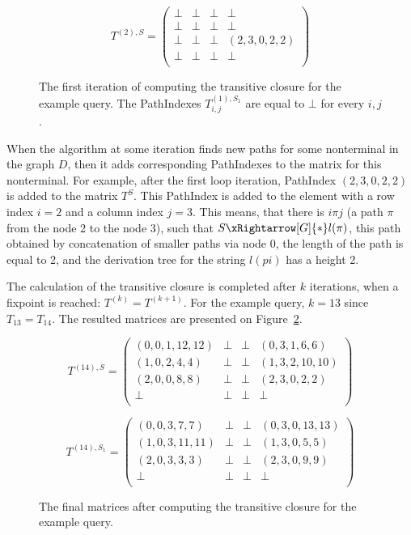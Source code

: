 \begin{figure}[h]
	\[
	T^{(2),S} = \begin{pmatrix}
	\bot & \bot       & \bot & \bot       \\
	\bot & \bot & \bot       & \bot \\
	\bot       & \bot & \bot & (2,3,0,2,2) \\
	\bot       & \bot & \bot & \bot \\
	\end{pmatrix}
	\]
	\caption{The first iteration of computing the transitive closure for the example query. The PathIndexes $T^{(1),S_1}_{i,j}$ are equal to $\bot$ for every $i,j$.}
	\label{ExampleQueryFirstIteration}
\end{figure}

When the algorithm at some iteration finds new paths for some nonterminal in the graph $D$, then it adds corresponding PathIndexes to the matrix for this nonterminal. For example, after the first loop iteration, PathIndex $(2,3,0,2,2)$ is added to the matrix $T^{S}$. This PathIndex is added to the element with a row index $i = 2$ and a column index $j = 3$. This means, that there is $i\pi j$ (a path $\pi$ from the node 2 to the node 3), such that $S \xRightarrow[G]{*} l(\pi)$, this path obtained by concatenation of smaller paths via node 0, the length of the path is equal to 2, and the derivation tree for the string $l(pi)$ has a height 2.

The calculation of the transitive closure is completed after $k$ iterations, when a fixpoint is reached: $T^{(k)} = T^{(k+1)}$. For the example query, $k = 13$ since $T_{13} = T_{14}$. The resulted matrices are presented on Figure~\ref{ExampleQueryFinalMatrices}.

\begin{figure}[h]
	\[
	T^{(14),S} = \begin{pmatrix}
	(0,0,1,12,12) & \bot       & \bot & (0,3,1,6,6)       \\
	(1,0,2,4,4) & \bot & \bot       & (1,3,2,10,10) \\
	(2,0,0,8,8)       & \bot & \bot & (2,3,0,2,2) \\
	\bot       & \bot & \bot & \bot \\
	\end{pmatrix}
	\]
	
	\[
	T^{(14),S_1} = \begin{pmatrix}
	(0,0,3,7,7)  & \bot       & \bot & (0,3,0,13,13)       \\
	(1,0,3,11,11) & \bot & \bot       & (1,3,0,5,5) \\
	(2,0,3,3,3)       & \bot & \bot & (2,3,0,9,9) \\
	\bot       & \bot & \bot & \bot \\
	\end{pmatrix}
	\]
	\caption{The final matrices after computing the transitive closure for the example query.}
	\label{ExampleQueryFinalMatrices}
\end{figure}

